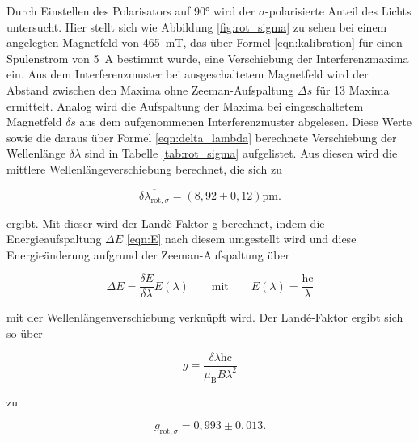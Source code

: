             \FloatBarrier

            Durch Einstellen des Polarisators auf 90° wird der $\sigma$-polarisierte Anteil des Lichts untersucht. Hier stellt sich wie Abbildung \ref{fig:rot_sigma} zu sehen bei einem angelegten Magnetfeld von 
            \SI{465}{\milli\tesla}, das über Formel \ref{eqn:kalibration} für einen Spulenstrom von \SI{5}{\ampere} bestimmt wurde, eine Verschiebung der Interferenzmaxima ein. Aus dem Interferenzmuster bei 
            ausgeschaltetem Magnetfeld wird der Abstand zwischen den Maxima ohne Zeeman-Aufspaltung $\Delta s$
            für 13 Maxima ermittelt. Analog wird die Aufspaltung der Maxima bei eingeschaltetem Magnetfeld $\delta s$ aus dem aufgenommenen Interferenzmuster abgelesen. Diese Werte sowie die daraus über Formel
            \ref{eqn:delta_lambda} berechnete Verschiebung der Wellenlänge $\delta\lambda$ sind in Tabelle \ref{tab:rot_sigma} aufgelistet. Aus diesen wird die mittlere Wellenlängeverschiebung berechnet, die sich 
            zu

            \begin{equation*}
                \overline{\delta \lambda_{\text{rot}, \sigma}} = \left(8,92 \pm 0,12\right)\si{\pico\metre}.
            \end{equation*}

            ergibt. Mit dieser wird der Landè-Faktor g berechnet, indem die Energieaufspaltung $\Delta E$ \ref{eqn:E} nach diesem umgestellt wird und diese Energieänderung aufgrund der 
            Zeeman-Aufspaltung über 

            \begin{equation*}
                \Delta E = \frac{\delta E}{\delta \lambda} E(\lambda) \qquad \text{mit} \qquad E(\lambda) = \frac{\text{hc}}{\lambda}
            \end{equation*}

            mit der Wellenlängenverschiebung verknüpft wird. Der Landé-Faktor ergibt sich so über
            
            \begin{equation}
              g = \frac{\delta\lambda\text{hc}}{\mu_{\text{B}}B\lambda^2}
              \label{eqn:Lande}
            \end{equation}
            
            zu

            \begin{equation*}
                g_{\text{rot}, \sigma} = 0,993 \pm 0,013 .
            \end{equation*}


